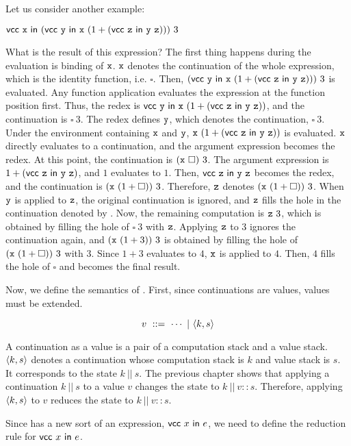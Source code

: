 Let us consider another example:

$
\textsf{vcc}\ \texttt{x}\ \textsf{in}\ (\textsf{vcc}\ \texttt{y}\ \textsf{in}\ \texttt{x}\ (1+(\textsf{vcc}\ \texttt{z}\ \textsf{in}\ \texttt{y}\ \texttt{z})))\ 3
$

What is the result of this expression?
The first thing happens during the evaluation is binding of $\texttt{x}$. $\texttt{x}$ denotes the
continuation of the whole expression, which is the identity function, i.e.
$\square$. Then,
$(\textsf{vcc}\ \texttt{y}\ \textsf{in}\ \texttt{x}\ (1+(\textsf{vcc}\ \texttt{z}\ \textsf{in}\ \texttt{y}\ \texttt{z})))\ 3$ is
evaluated. Any function application evaluates the expression at the function
position first. Thus, the redex is
$\textsf{vcc}\ \texttt{y}\ \textsf{in}\ \texttt{x}\ (1+(\textsf{vcc}\ \texttt{z}\ \textsf{in}\ \texttt{y}\ \texttt{z}))$, and the
continuation is $\square\ 3$. The redex defines $\texttt{y}$, which denotes the
continuation, $\square\ 3$. Under the environment containing $\texttt{x}$ and $\texttt{y}$,
$\texttt{x}\ (1+(\textsf{vcc}\ \texttt{z}\ \textsf{in}\ \texttt{y}\ \texttt{z}))$ is evaluated. $\texttt{x}$ directly
evaluates to a continuation, and the argument expression becomes the redex.
At this point, the continuation is $(\cx\ \square)\ 3$. The argument
expression is $1+(\textsf{vcc}\ \texttt{z}\ \textsf{in}\ \texttt{y}\ \texttt{z})$, and $1$ evaluates to $1$.
Then, $\textsf{vcc}\ \texttt{z}\ \textsf{in}\ \texttt{y}\ \texttt{z}$ becomes the redex, and the continuation is
$(\texttt{x}\ (1+\square))\ 3$. Therefore, $\texttt{z}$ denotes $(\texttt{x}\ (1+\square))\ 3$.
When $\texttt{y}$ is applied to $\texttt{z}$, the original continuation is ignored, and $\texttt{z}$ fills
the hole in the continuation denoted by \cy. Now, the remaining computation
is $\texttt{z}\ 3$, which is obtained by filling the hole of $\square\ 3$ with $\texttt{z}$.
Applying $\texttt{z}$ to $3$ ignores the continuation again, and $(\cx\ (1+3))\
3$ is obtained by filling the hole of $(\texttt{x}\ (1+\square))\ 3$ with $3$.
Since $1+3$ evaluates to $4$, $\texttt{x}$ is applied to $4$. Then, $4$ fills the hole of
$\square$ and becomes the final result.

Now, we define the semantics of \lang. First, since continuations are values,
values must be extended.

\[
  v\ ::=\ \cdots\ |\ \contv{k}{s}
\]

A continuation as a value is a pair of a computation
stack and a value stack. $\langle k,s\rangle$ denotes a continuation whose computation
stack is $k$ and value stack is $s$. It corresponds to the state $k\ ||\ s$.
The previous chapter shows that applying a continuation $k\ ||\ s$ to a value
$v$ changes the state to $k\ ||\ v::s$. Therefore, applying $\langle k,s\rangle$
to $v$ reduces the state to $k\ ||\ v::s$.

Since \lang has a new sort of an expression, $\textsf{vcc}\ x\ \textsf{in}\ e$, we need to define
the reduction rule for $\textsf{vcc}\ x\ \textsf{in}\ e$.

